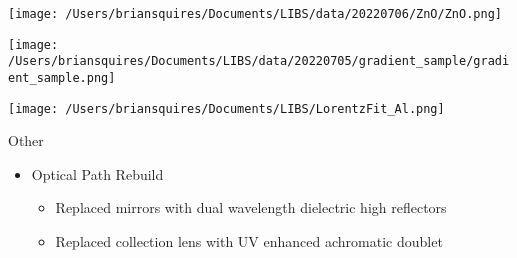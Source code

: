 \documentclass{beamer}
\begin{document}
\begin{frame}
    \texttt{[image: /Users/briansquires/Documents/LIBS/data/20220706/ZnO/ZnO.png]}
\end{frame}

\begin{frame}
    \texttt{[image: /Users/briansquires/Documents/LIBS/data/20220705/gradient\_sample/gradient\_sample.png]}
\end{frame}

\begin{frame}
    \texttt{[image: /Users/briansquires/Documents/LIBS/LorentzFit\_Al.png]}
\end{frame}

\begin{frame}{Other}
    \begin{itemize}
        \item Optical Path Rebuild
        \begin{itemize}
            \item Replaced mirrors with dual wavelength dielectric high reflectors
            \item Replaced collection lens with UV enhanced achromatic doublet
        \end{itemize}
    \end{itemize}
\end{frame}
\end{document}
